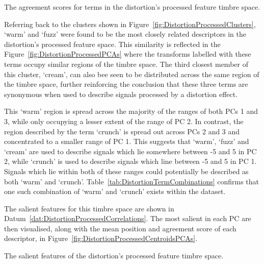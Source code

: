 			\begin{table}[h!]
				\centering
				
				\caption{The agreement scores for terms in the 
					 distortion's processed feature timbre space.}
				\label{tab:DistortionProcessedAgreements}
			\end{table}

			Referring back to the clusters shown in Figure~\ref{fig:DistortionProcessedClusters}, `warm' and
			`fuzz' were found to be the most closely related descriptors in the distortion's processed feature
			space. This similarity is reflected in the Figure~\ref{fig:DistortionProcessedPCAs} where the
			transforms labelled with these terms occupy similar regions of the timbre space. The third closest
			member of this cluster, `cream', can also bee seen to be distributed across the same region of the
			timbre space, further reinforcing the conclusion that these three terms are synonymous when used to
			describe signals processed by a distortion effect.

			This `warm' region is spread across the majority of the ranges of both PCs 1 and 3, while only
			occupying a lesser extent of the range of PC 2. In contrast, the region described by the term
			`crunch' is spread out across PCs 2 and 3 and concentrated to a smaller range of PC 1. This
			suggests that `warm', `fuzz' and `cream' are used to describe signals which lie somewhere between
			-5 and 5 in PC 2, while `crunch' is used to describe signals which line between -5 and 5 in PC 1.
			Signals which lie within both of these ranges could potentially be described as both `warm' and
			`crunch'. Table~\ref{tab:DistortionTermCombinations} confirms that one such combination of
			`warm' and `crunch' exists within the dataset.

			The salient features for this timbre space are shown in
			Datum~\ref{dat:DistortionProcessedCorrelations}. The most salient in each PC are then visualised,
			along with the mean position and agreement score of each descriptor, in
			Figure~\ref{fig:DistortionProcessedCentroidsPCAs}. 

			\begin{datum}[h!]
				\centering
				\begin{minipage}{0.9\textwidth}
					
				\end{minipage}
				\caption{The salient features of the distortion's 
					 processed feature timbre space.}
				\label{dat:DistortionProcessedCorrelations}
			\end{datum}

